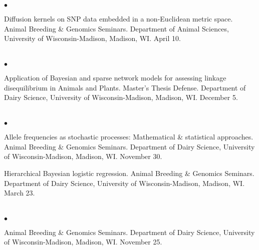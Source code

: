 \documentclass[margin,line,10pt]{res}
\newenvironment{list2}{
  \begin{list}{$\bullet$}{%
      \setlength{\itemsep}{0in}
      \setlength{\parsep}{0in} \setlength{\parskip}{0in}
      \setlength{\topsep}{0in} \setlength{\partopsep}{0in} 
      \setlength{\leftmargin}{0.2in}}}{\end{list}}
\begin{document}
\begin{resume}
\section{}
\begin{list2}
 \item Diffusion kernels on SNP data embedded in a non-Euclidean metric space. Animal Breeding \& Genomics Seminars.  Department of Animal Sciences, University of Wisconsin-Madison, Madison, WI. April 10.
\end{list2}  

\section{}
\begin{list2}
\item  Application of Bayesian and sparse network models for assessing linkage disequilibrium in Animals and Plants. Master's Thesis Defense.  Department of Dairy Science, University of Wisconsin-Madison, Madison, WI. December 5. 
\end{list2}  

\section{}
\begin{list2}
\item Allele frequencies as stochastic processes: Mathematical \& statistical approaches. Animal Breeding \& Genomics Seminars.  Department of Dairy Science, University of Wisconsin-Madison, Madison, WI. November 30.
\vspace{0.5cm}
\item Hierarchical Bayesian logistic regression. Animal Breeding \& Genomics Seminars.  Department of Dairy Science, University of Wisconsin-Madison, Madison, WI. March 23. 
\end{list2}

\section{}
\begin{list2}
\item  Animal Breeding \& Genomics Seminars.  Department of Dairy Science, University of Wisconsin-Madison, Madison, WI. November 25. 
\end{list2}




\vspace{0.5cm}

\end{resume}
\end{document}
